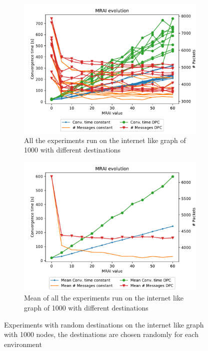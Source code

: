 \documentclass[10pt,conference,letterpaper]{IEEEtran}
\newcommand{\figwidth}{0.78}
\newcommand{\figvspace}{-1.5em}
\begin{document}
\begin{figure}[tb]
	\centering

	\begin{subfigure}{\columnwidth}
		\centering
		\includegraphics[width=\figwidth\columnwidth]{images/internet_like/S_AW/different_destinations-1000_all.pdf}
		\caption{All the experiments run on the internet like graph of \num{1000} with different destinations}
		\label{fig:s_aw_different_desintations_all_1000}
		\qquad
	\end{subfigure}

	\begin{subfigure}{\columnwidth}
		\centering
		\includegraphics[width=\figwidth\columnwidth]{images/internet_like/S_AW/different_destinations-1000_mean}
		\caption{Mean of all the experiments run on the internet like graph of \num{1000} with different destinations}
		\label{fig:s_aw_different_desintations_mean_1000}
		\qquad
	\end{subfigure}

	\caption{Experiments with random destinations on the internet like graph with
		\num{1000} nodes, the destinations are chosen randomly for each environment}
	\label{fig:s_aw_different_desintations_1000}
	\vspace{\figvspace}
\end{figure}
\end{document}
